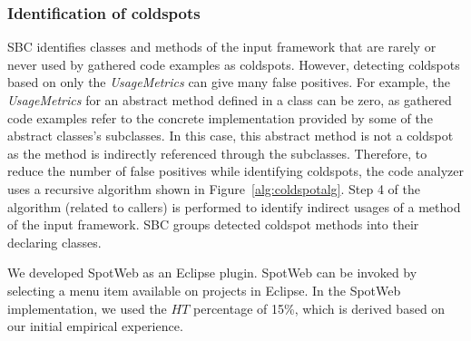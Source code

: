\subsubsection{Identification of coldspots}
SBC identifies classes and methods of the input framework that are rarely or never used
by gathered code examples as coldspots. However, detecting coldspots based on only the
\emph{UsageMetrics} can give many false positives. For example, the
\emph{UsageMetrics} for an abstract method defined in a class can be zero, as
gathered code examples refer to the concrete implementation provided
by some of the abstract classes's subclasses. In this case, this abstract method is
not a coldspot as the method is indirectly referenced through the
subclasses. Therefore, to reduce the number of false positives
while identifying coldspots, the code analyzer uses a recursive
algorithm shown in Figure~\ref{alg:coldspotalg}. 
 Step 4 of the algorithm (related to callers)
is performed to identify indirect usages of a method of the input framework. 
SBC groups detected coldspot methods into their declaring classes.

We developed SpotWeb as an Eclipse plugin. SpotWeb can be invoked by selecting
a menu item available on projects in Eclipse. In the SpotWeb implementation, 
we used the $HT$ percentage of 15\%, which is derived based on our
initial empirical experience.